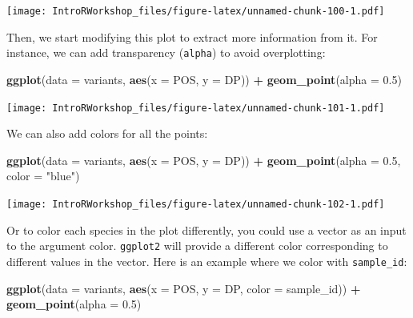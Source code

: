 \documentclass[
]{book}
\newenvironment{Shaded}{\begin{snugshade}}{\end{snugshade}}
\newcommand{\AttributeTok}[1]{\textcolor[rgb]{0.13,0.29,0.53}{#1}}
\newcommand{\FloatTok}[1]{\textcolor[rgb]{0.00,0.00,0.81}{#1}}
\newcommand{\FunctionTok}[1]{\textcolor[rgb]{0.13,0.29,0.53}{\textbf{#1}}}
\newcommand{\NormalTok}[1]{#1}
\newcommand{\SpecialCharTok}[1]{\textcolor[rgb]{0.81,0.36,0.00}{\textbf{#1}}}
\newcommand{\StringTok}[1]{\textcolor[rgb]{0.31,0.60,0.02}{#1}}
\begin{document}
\texttt{[image: IntroRWorkshop\_files/figure-latex/unnamed-chunk-100-1.pdf]}

Then, we start modifying this plot to extract more information from it. For instance, we can add transparency (\texttt{alpha}) to avoid overplotting:

\begin{Shaded}
\begin{Highlighting}[]
\FunctionTok{ggplot}\NormalTok{(}\AttributeTok{data =}\NormalTok{ variants, }\FunctionTok{aes}\NormalTok{(}\AttributeTok{x =}\NormalTok{ POS, }\AttributeTok{y =}\NormalTok{ DP)) }\SpecialCharTok{+}
    \FunctionTok{geom\_point}\NormalTok{(}\AttributeTok{alpha =} \FloatTok{0.5}\NormalTok{)}
\end{Highlighting}
\end{Shaded}

\texttt{[image: IntroRWorkshop\_files/figure-latex/unnamed-chunk-101-1.pdf]}

We can also add colors for all the points:

\begin{Shaded}
\begin{Highlighting}[]
\FunctionTok{ggplot}\NormalTok{(}\AttributeTok{data =}\NormalTok{ variants, }\FunctionTok{aes}\NormalTok{(}\AttributeTok{x =}\NormalTok{ POS, }\AttributeTok{y =}\NormalTok{ DP)) }\SpecialCharTok{+}
  \FunctionTok{geom\_point}\NormalTok{(}\AttributeTok{alpha =} \FloatTok{0.5}\NormalTok{, }\AttributeTok{color =} \StringTok{"blue"}\NormalTok{)}
\end{Highlighting}
\end{Shaded}

\texttt{[image: IntroRWorkshop\_files/figure-latex/unnamed-chunk-102-1.pdf]}

Or to color each species in the plot differently, you could use a vector as an input to the argument color. \texttt{ggplot2} will provide a different color corresponding to different values in the vector. Here is an example where we color with \texttt{sample\_id}:

\begin{Shaded}
\begin{Highlighting}[]
\FunctionTok{ggplot}\NormalTok{(}\AttributeTok{data =}\NormalTok{ variants, }\FunctionTok{aes}\NormalTok{(}\AttributeTok{x =}\NormalTok{ POS, }\AttributeTok{y =}\NormalTok{ DP, }\AttributeTok{color =}\NormalTok{ sample\_id)) }\SpecialCharTok{+}
  \FunctionTok{geom\_point}\NormalTok{(}\AttributeTok{alpha =} \FloatTok{0.5}\NormalTok{)}
\end{Highlighting}
\end{Shaded}
\end{document}
